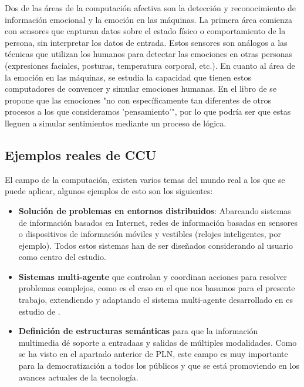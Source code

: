 Dos de las áreas de la computación afectiva son la detección y reconocimiento de información emocional y la emoción en las máquinas. La primera área comienza con sensores que capturan datos sobre el estado físico o comportamiento de la persona, sin interpretar los datos de entrada. Estos sensores son análogos a las técnicas que utilizan los humanos para detectar las emociones en otras personas (expresiones faciales, posturas, temperatura corporal, etc.). En cuanto al área de la emoción en las máquinas, se estudia la capacidad que tienen estos computadores de convencer y simular emociones humanas. En el libro de \cite{minsky2007emotion} se propone que las emociones "no con específicamente tan diferentes de otros procesos a los que consideramos 'pensamiento'", por lo que podría ser que estas lleguen a simular sentimientos mediante un proceso de lógica.

\subsection{Ejemplos reales de CCU }

El campo de la computación, existen varios temas del mundo real a los que se puede aplicar, algunos ejemplos de esto son los siguientes:

\begin{itemize}
	\item \textbf{Solución de problemas en entornos distribuidos}: Abarcando sistemas de información basados en Internet, redes de información basadas en sensores o dispositivos de información móviles y vestibles (relojes inteligentes, por ejemplo). Todos estos sistemas han de ser diseñados considerando al usuario como centro del estudio.
	
	\item \textbf{Sistemas multi-agente} que controlan y coordinan acciones para resolver problemas complejos, como es el caso en el que nos basamos para el presente trabajo, extendiendo y adaptando el sistema multi-agente desarrollado en es estudio de \cite{park2023generative}.
	
	\item \textbf{Definición de estructuras semánticas} para que la información multimedia dé soporte a entradaas y salidas de múltiples modalidades. Como se ha visto en el apartado anterior de PLN, este campo es muy importante para la democratización a todos los públicos y que se está promoviendo en los avances actuales de la tecnología.
	
\end{itemize}

